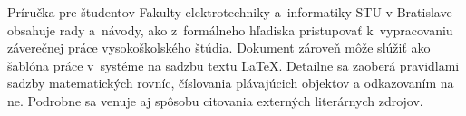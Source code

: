 Príručka pre študentov Fakulty elektrotechniky 
a~informatiky STU v Bratislave obsahuje rady a~návody, 
ako z~formálneho hľadiska pristupovať k~vypracovaniu 
záverečnej práce vysokoškolského štúdia.
Dokument zároveň môže slúžiť ako šablóna práce
v~systéme na sadzbu textu \LaTeX.
Detailne sa zaoberá pravidlami sadzby
matematických rovníc,
číslovania plávajúcich objektov a odkazovaním na ne. 
Podrobne sa venuje aj spôsobu citovania externých 
literárnych zdrojov.